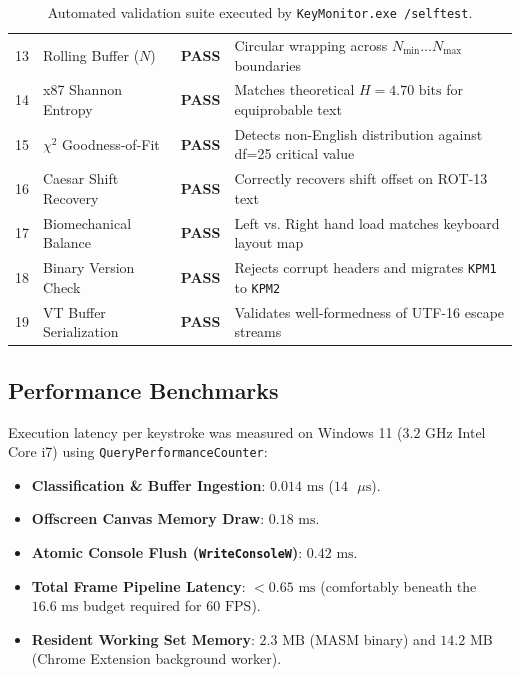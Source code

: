 \documentclass[11pt,a4paper]{article}
\begin{document}
\begin{table}[htbp]
\begin{tabularx}{\textwidth}{llcX}
  13 & Rolling Buffer ($N$) & \textbf{PASS} & Circular wrapping across $N_{\text{min}} \dots N_{\text{max}}$ boundaries \\
  14 & x87 Shannon Entropy & \textbf{PASS} & Matches theoretical $H = 4.70\text{ bits}$ for equiprobable text \\
  15 & $\chi^2$ Goodness-of-Fit & \textbf{PASS} & Detects non-English distribution against df=25 critical value \\
  16 & Caesar Shift Recovery & \textbf{PASS} & Correctly recovers shift offset on ROT-13 text \\
  17 & Biomechanical Balance & \textbf{PASS} & Left vs. Right hand load matches keyboard layout map \\
  18 & Binary Version Check & \textbf{PASS} & Rejects corrupt headers and migrates \texttt{KPM1} to \texttt{KPM2} \\
  19 & VT Buffer Serialization & \textbf{PASS} & Validates well-formedness of UTF-16 escape streams \\
  \bottomrule
\end{tabularx}
\caption{Automated validation suite executed by \texttt{KeyMonitor.exe /selftest}.}
\label{tab:selftest}
\end{table}

\subsection{Performance Benchmarks}
Execution latency per keystroke was measured on Windows 11 ($3.2\text{ GHz}$ Intel Core i7) using \texttt{QueryPerformanceCounter}:
\begin{itemize}[leftmargin=*]
  \item \textbf{Classification \& Buffer Ingestion}: $0.014\text{ ms}$ ($14\text{ }\mu\text{s}$).
  \item \textbf{Offscreen Canvas Memory Draw}: $0.18\text{ ms}$.
  \item \textbf{Atomic Console Flush (\texttt{WriteConsoleW})}: $0.42\text{ ms}$.
  \item \textbf{Total Frame Pipeline Latency}: $< 0.65\text{ ms}$ (comfortably beneath the $16.6\text{ ms}$ budget required for $60\text{ FPS}$).
  \item \textbf{Resident Working Set Memory}: $2.3\text{ MB}$ (MASM binary) and $14.2\text{ MB}$ (Chrome Extension background worker).
\end{itemize}

\end{document}
